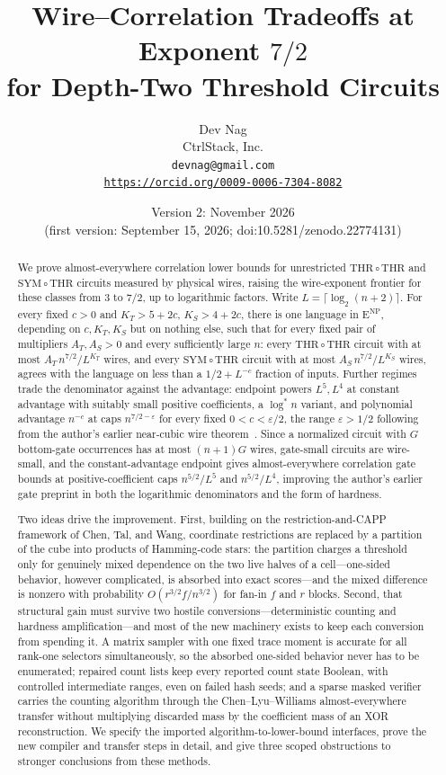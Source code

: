 \documentclass[11pt,letterpaper]{article}
\title{Wire--Correlation Tradeoffs at Exponent $7/2$\texorpdfstring{\\}{: }for Depth-Two Threshold Circuits}
\author{Dev Nag\\
CtrlStack, Inc.\\
\texttt{devnag@gmail.com}\\
\href{https://orcid.org/0009-0006-7304-8082}{\nolinkurl{https://orcid.org/0009-0006-7304-8082}}}
\date{Version 2: November 2026\\
(first version: September 15, 2026; doi:10.5281/zenodo.22774131)}
\theoremstyle{definition}
\theoremstyle{remark}
\newcommand{\THR}{\mathrm{THR}}
\newcommand{\SYM}{\mathrm{SYM}}
\newcommand{\ENP}{\mathrm{E}^{\mathrm{NP}}}
\begin{document}
\hypersetup{pageanchor=false}
\begin{titlepage}
\maketitle
\thispagestyle{empty}
\begin{abstract}
We prove almost-everywhere correlation lower bounds for unrestricted
$\THR\circ\THR$ and $\SYM\circ\THR$ circuits measured by physical
wires, raising the wire-exponent frontier for these classes from $3$
to $7/2$, up to logarithmic factors. Write
$L=\lceil\log_2(n+2)\rceil$. For every fixed $c>0$ and $K_T>5+2c$,
$K_S>4+2c$, there is one language in $\ENP$, depending on $c,K_T,K_S$
but on nothing else, such that for every fixed pair of multipliers
$A_T,A_S>0$ and every sufficiently large $n$: every $\THR\circ\THR$
circuit with at most $A_T\,n^{7/2}/L^{K_T}$ wires, and every
$\SYM\circ\THR$ circuit with at most $A_S\,n^{7/2}/L^{K_S}$ wires,
agrees with the language on less than a $1/2+L^{-c}$ fraction of
inputs. Further regimes trade the denominator against the advantage:
endpoint powers $L^5,L^4$ at constant advantage with suitably small
positive coefficients, a $\log^*n$ variant, and polynomial advantage
$n^{-c}$ at caps $n^{7/2-\varepsilon}$ for every fixed
$0<c<\varepsilon/2$, the range $\varepsilon>1/2$ following from the
author's earlier near-cubic wire
theorem~\cite{NagCubic}. Since a
normalized circuit with $G$ bottom-gate occurrences has at most
$(n+1)G$ wires, gate-small circuits are wire-small, and the
constant-advantage endpoint gives almost-everywhere correlation gate
bounds at positive-coefficient caps $n^{5/2}/L^{5}$ and
$n^{5/2}/L^{4}$, improving the author's earlier gate preprint in both
the logarithmic denominators and the form of hardness.

Two ideas drive the improvement. First, building on the
restriction-and-CAPP framework of Chen, Tal, and Wang, coordinate
restrictions are replaced by a partition of the cube into products of
Hamming-code stars: the partition charges a threshold only for
genuinely mixed dependence on the two live halves of a
cell---one-sided behavior, however complicated, is absorbed into
exact scores---and the mixed difference is nonzero with probability
$O(r^{3/2}f/n^{3/2})$ for fan-in $f$ and $r$ blocks. Second, that
structural gain must survive two hostile conversions---deterministic
counting and hardness amplification---and most of the new machinery
exists to keep each conversion from spending it. A matrix sampler
with one fixed trace moment is accurate for all rank-one selectors
simultaneously, so the absorbed one-sided behavior never has to be
enumerated; repaired count lists keep every reported count state
Boolean, with controlled intermediate ranges, even on failed hash
seeds; and a sparse masked verifier carries the counting algorithm
through the Chen--Lyu--Williams almost-everywhere transfer without
multiplying discarded mass by the coefficient mass of an XOR
reconstruction. We specify the imported algorithm-to-lower-bound
interfaces, prove the new compiler and transfer steps in detail, and
give three scoped obstructions to stronger conclusions from these
methods.
\end{abstract}
\end{titlepage}
\end{document}
